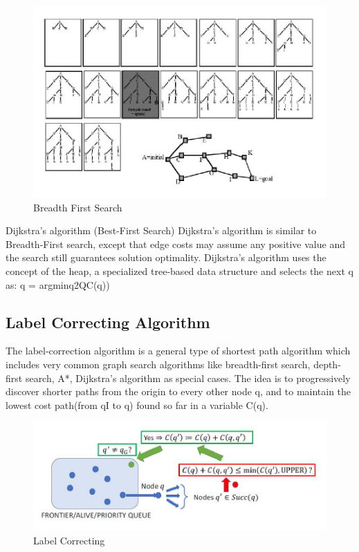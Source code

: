 \documentclass[twoside]{article}
\begin{document}
\begin{figure}[h]
\begin{center}
\includegraphics{fig15_9.PNG}
\caption{Breadth First Search}
\end{center}
\end{figure}

Dijkstra’s algorithm (Best-First Search)
Dijkstra’s algorithm is similar to Breadth-First search, except that edge costs may assume any positive value and the search still guarantees solution optimality. Dijkstra’s algorithm uses the concept of the heap, a specialized tree-based data structure and selects the next q as: q = argminq2QC(q))

\subsection{Label Correcting Algorithm}
The label-correction algorithm is a general type of shortest path algorithm which includes very common graph search algorithms like breadth-first search, depth-first search, A*, Dijkstra’s algorithm as special cases.
The idea is to progressively discover shorter paths from the origin to every other node q, and to maintain the lowest cost path(from qI to q) found so far in a variable C(q).

\begin{figure}[h]
\begin{center}
\includegraphics{fig15_10.PNG}
\caption{Label Correcting}
\end{center}
\end{figure}
\end{document}
